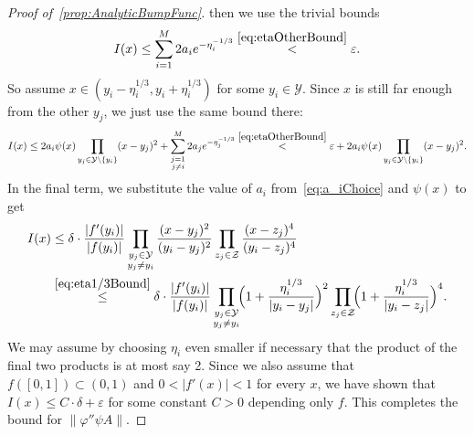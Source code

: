 \documentclass[12pt,]{article}
\def\cref#1{\ref{#1}}%
\theoremstyle{definition}
\theoremstyle{remark}
\newcommand{\0}{\mathbf{0}}
\begin{document}
\begin{proof}[Proof of~\cref{prop:AnalyticBumpFunc}]
then we use the trivial bounds
\begin{equation*}
	I(x) \leq \sum_{i=1}^{M} 2a_ie^{-\eta_i^{-1/3}} \stackrel{\eqref{eq:etaOtherBound}}{<} \varepsilon.
\end{equation*}
So assume $x\in(y_i-\eta_i^{1/3}, y_i+\eta_i^{1/3})$ for some $y_i\in\mathcal{Y}$. Since $x$ is
still far enough from the other $y_j$, we just use the same bound there:
\begin{equation*}
	I(x) \leq 2a_i \psi(x) \prod_{y_j\in\mathcal{Y}\setminus\{y_i\}} (x-y_j)^2 +
	\sum_{\substack{j=1 \\ j\neq i}}^{M} 2a_j e^{-\eta_j^{-1/3}}
	\stackrel{\eqref{eq:etaOtherBound}}{<} \varepsilon + 2a_i \psi(x)
	\prod_{y_j\in\mathcal{Y}\setminus\{y_i\}} (x-y_j)^2.
\end{equation*}
In the final term, we substitute the value of $a_i$ from~\cref{eq:a_iChoice} and $\psi(x)$ to get
\begin{align*}
	I(x)&\leq \delta \cdot \frac{|f'(y_i)|}{|f(y_i)|} \prod_{\substack{y_j\in\mathcal{Y} \\
	y_j\neq y_i}} \frac{(x-y_j)^2}{(y_i - y_j)^2}  \prod_{z_j\in\mathcal{Z}}
	\frac{(x-z_j)^4}{(y_i - z_j)^4} \\
	&\stackrel{\eqref{eq:eta1/3Bound}}{\leq}  \delta \cdot
	\frac{|f'(y_i)|}{|f(y_i)|}\prod_{\substack{y_j\in\mathcal{Y} \\ y_j\neq y_i}}\!\! \Big(
	1+\frac{\eta_i^{1/3}}{|y_i-y_j|} \Big)^2 \prod_{z_j\in\mathcal{Z}}\!\! \Big(
      1+\frac{\eta_i^{1/3}}{|y_i-z_j|} \Big)^4. 
\end{align*}
We may assume by choosing $\eta_i$ even smaller if necessary that the product of the final two
products is at most say 2. Since we also assume that $f([0,1])\subset (0,1)$ and $0<|f'(x)|<1$ for
every $x$, we have shown that $I(x)\leq C\cdot\delta+\varepsilon$ for some constant $C>0$ depending
only $f$. This completes the bound for $\| \varphi'' \psi A\|$. 
\end{proof}
\end{document}
